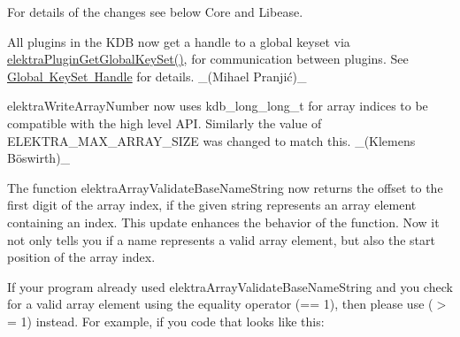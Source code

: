 For details of the changes see below {\ttfamily Core} and {\ttfamily Libease}.


\begin{DoxyItemize}
\item All plugins in the K\+DB now get a handle to a global keyset via {\ttfamily \mbox{\hyperlink{group__plugin_ga436cda13ed70c0face08661a90620bf6}{elektra\+Plugin\+Get\+Global\+Key\+Set()}}}, for communication between plugins. See \mbox{\hyperlink{doc_decisions_global_keyset_md}{Global Key\+Set Handle}} for details. \+\_\+(Mihael Pranjić)\+\_\+
\item {\ttfamily elektra\+Write\+Array\+Number} now uses {\ttfamily kdb\+\_\+long\+\_\+long\+\_\+t} for array indices to be compatible with the high level A\+PI. Similarly the value of {\ttfamily E\+L\+E\+K\+T\+R\+A\+\_\+\+M\+A\+X\+\_\+\+A\+R\+R\+A\+Y\+\_\+\+S\+I\+ZE} was changed to match this. \+\_\+(Klemens Böswirth)\+\_\+
\end{DoxyItemize}


\begin{DoxyItemize}
\item The function {\ttfamily elektra\+Array\+Validate\+Base\+Name\+String} now returns the offset to the first digit of the array index, if the given string represents an array element containing an index. This update enhances the behavior of the function. Now it not only tells you if a name represents a valid array element, but also the start position of the array index.
\end{DoxyItemize}


\begin{DoxyCode}{0}
\DoxyCodeLine{\textcolor{comment}{//                                     ~~\string^ Returns `2` (instead of `1`)}}
\DoxyCodeLine{}
\DoxyCodeLine{\textcolor{comment}{//                                   ~~~~\string^ Returns `4` (instead of `1`)}}
\end{DoxyCode}


If your program already used {\ttfamily elektra\+Array\+Validate\+Base\+Name\+String} and you check for a valid array element using the equality operator ({\ttfamily == 1}), then please use ({\ttfamily $>$= 1}) instead. For example, if you code that looks like this\+:



